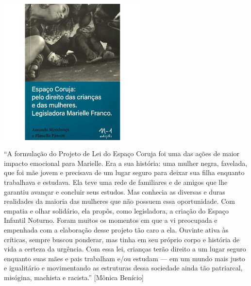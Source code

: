 \pagebreak %

\begin{center}
\hspace*{.5cm}\includegraphics[width=74mm]{./grid/coruja.jpg}
\end{center}

\hspace*{-7cm}\hrulefill\hspace*{-7cm}

\medskip

\noindent{}“A formulação do Projeto de Lei do Espaço Coruja foi uma das ações de maior impacto emocional para Marielle. Era a sua história: uma mulher negra, favelada, que foi mãe jovem e precisava de um lugar seguro para deixar sua filha enquanto trabalhava e estudava. Ela teve uma rede de familiares e de amigos que lhe garantiu avançar e concluir seus estudos. Mas conhecia as diversas e duras realidades da maioria das mulheres que não possuem essa oportunidade. Com empatia e olhar solidário, ela propôs, como legisladora, a criação do Espaço Infantil Noturno. Foram muitos os momentos em que a vi preocupada e empenhada com a elaboração desse projeto tão caro a ela. Ouvinte ativa às críticas, sempre buscou ponderar, mas tinha em seu próprio corpo e história de vida a certeza da urgência. Com essa lei, crianças terão direito a um lugar seguro enquanto suas mães e pais trabalham e/ou estudam --- em um mundo mais justo e igualitário e movimentando as estruturas dessa sociedade ainda tão patriarcal, misógina, machista e racista.” [Mônica Benício]


\vfill

\hspace*{-.4cm}\begin{minipage}[c]{1\linewidth}
\small{
{}}
\end{minipage}

